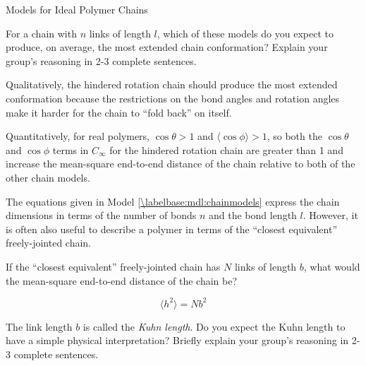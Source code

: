\begin{activity}{Models for Ideal Polymer Chains}
\begin{ctqs}
	\question For a chain with $n$ links of length $l$, which of these models do you expect to produce, on average, the most extended chain conformation?  Explain your group's reasoning in 2-3 complete sentences. \label{\labelbase:ctq:stiffness}
	
		\begin{solution}[1.5in]{}
			Qualitatively, the hindered rotation chain should produce the most extended conformation because the restrictions on the bond angles and rotation angles make it harder for the chain to ``fold back'' on itself.
			
			Quantitatively, for real polymers, $\cos\theta > 1$ and $\langle \cos\phi \rangle > 1$, so both the $\cos \theta$ and $\cos \phi$ terms in $C_\infty$ for the hindered rotation chain are greater than 1 and increase the mean-square end-to-end distance of the chain relative to both of the other chain models.
		\end{solution}

	
	\question The equations given in Model \ref{\labelbase:mdl:chainmodels} express the chain dimensions in terms of the number of bonds $n$ and the bond length $l$.  However, it is often also useful to describe a polymer in terms of the ``closest equivalent'' freely-jointed chain. \label{\labelbase:ctq:statseg}
	
			If the ``closest equivalent'' freely-jointed chain has $N$ links of length $b$, what would the mean-square end-to-end distance of the chain be? \label{\labelbase:ctq:Nb2}
	
		\begin{solution}[0.75in]{}
			\begin{equation*}
				\langle h^2 \rangle = Nb^2
			\end{equation*}
		\end{solution}
			
%	
%		
		
	\question The link length $b$ is called the \emph{Kuhn length}.  Do you expect the Kuhn length to have a simple physical interpretation?  Briefly explain your group's reasoning in 2-3 complete sentences.\label{\labelbase:exc:statseginterp}
	

\end{ctqs}
\end{activity}
